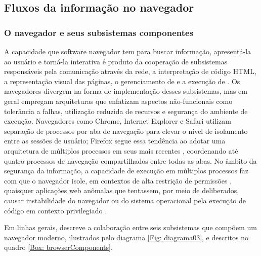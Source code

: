 \subsection{Fluxos da informação no navegador}

\subsubsection{O navegador e seus subsistemas componentes}
A capacidade que software navegador tem para buscar informação, apresentá-la ao usuário e torná-la interativa é produto da cooperação de subsistemas responsáveis pela comunicação através da rede, a interpretação de código HTML, a representação visual das páginas, o gerenciamento de  e a execução de \scripts{}. Os navegadores divergem na forma de implementação desses subsistemas, mas em geral empregam arquiteturas que enfatizam aspectos não-funcionais como tolerância a falhas, utilização reduzida de recursos e segurança do ambiente de execução. Navegadores como Chrome, Internet Explorer e Safari utilizam separação de processos por aba de navegação \cite{Bright2016} para elevar o nível de isolamento entre as sessões de usuário; Firefox segue essa tendência ao adotar uma arquitetura de múltiplos processos em seus  mais recentes \cite{Nguyen2017}, coordenando até quatro processos de navegação compartilhados entre todas as abas. No âmbito da segurança da informação, a capacidade de execução em múltiplos processos faz com que o navegador isole, em contextos de alta restrição de permissões , quaisquer aplicações web anômalas que tentassem, por meio de  deliberados, causar instabilidade do navegador ou do sistema operacional pela execução de código em contexto privilegiado \cite{Chromium2018_MPA}.

Em linhas gerais, \citeauthor{HTML5Rocks2011} descreve a colaboração entre seis subsistemas que compõem um navegador moderno, ilustrados pelo diagrama \ref{Fig: diagrama03}, e descritos no quadro \ref{Box: browserComponents}.

